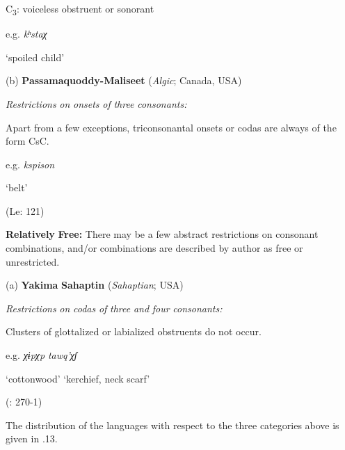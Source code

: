C\textsubscript{3}: voiceless obstruent or sonorant

e.g.  \textit{kʰstaχ}

    ‘spoiled child’

\citep[37]{Haspelmath1993}

(b)   \textbf{Passamaquoddy-Maliseet} (\textit{Algic}; Canada, USA)

\textit{Restrictions} \textit{on} \textit{onsets} \textit{of} \textit{three} \textit{consonants:}

Apart from a few exceptions, triconsonantal onsets or codas are always of the form CsC.

e.g.  \textit{kspison}

    ‘belt’

(Le\citealt{Sourd1993}: 121)
\z

\ea\label{ex:(3.29)}
  \textbf{Relatively} \textbf{Free:} There may be a few abstract restrictions on consonant combinations, and/or combinations are described by author as free or unrestricted.

(a)  \textbf{Yakima} \textbf{Sahaptin} (\textit{Sahaptian}; USA)

\textit{Restrictions} \textit{on} \textit{codas} \textit{of} \textit{three} \textit{and} \textit{four} \textit{consonants:}

Clusters of glottalized or labialized obstruents do not occur.

e.g.   \textit{χɨpχp}        \textit{tawq’χʃ}

    ‘cottonwood’      ‘kerchief, neck scarf’

(\citealt{HargusBeavert2002}: 270-1)

\z

  The distribution of the languages with respect to the three categories above is given in .13.


